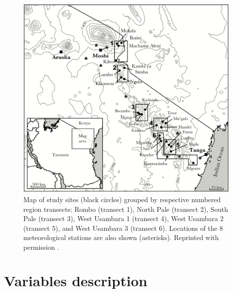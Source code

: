 \begin{figure}[!hb]
\center
\includegraphics[width=13cm]{images/site_map.jpeg}
\caption[Map of study sites]{Map of study sites (black circles) grouped by respective numbered region transects: Rombo (transect 1), North Pale (transect 2), South Pale (transect 3), West Usambara 1 (transect 4), West Usambara 2 (transect 5), and West Usambara 3 (transect 6).
Locations of the 8 meteorological stations are also shown (asterisks).
Reprinted with permission \cite{sepulveda2017malaria}.}
\label{fig:tanzania.map}
\end{figure}




\section{Variables description}


